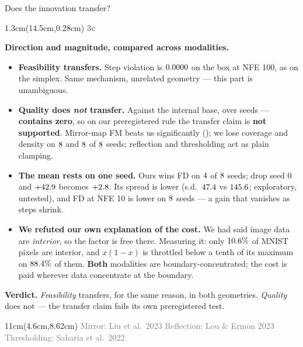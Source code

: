 \documentclass[aspectratio=169,10pt]{beamer}
\newcommand{\lab}[1]{%
  \begin{textblock*}{1.3cm}(14.5cm,0.28cm)
    \raggedleft\bfseries\small\textcolor{gray}{#1}
  \end{textblock*}}
\newcommand{\srcs}[1]{%
  \begin{textblock*}{11cm}(4.6cm,8.62cm)
    \raggedleft\fontsize{4.8}{5.6}\selectfont\textcolor{gray}{#1}
  \end{textblock*}}
\begin{document}
\begin{frame}{Does the innovation transfer?}
\lab{3c}
\textbf{Direction and magnitude, compared across modalities.}
\begin{itemize}
\item \textbf{Feasibility transfers.} Step violation is $0.0000$ on the box at NFE 100, as on
the simplex. Same mechanism, unrelated geometry --- this part is unambiguous.
\item \textbf{Quality does \emph{not} transfer.} Against the internal base, \MTwoClaim{}
over \MTwoSeeds{} seeds --- \textbf{contains zero}, so on our preregistered rule the transfer claim
is \textbf{not supported}. Mirror-map FM beats us significantly (\MTwoVsMirror); we lose
coverage and density on $8$ and $8$ of $8$ seeds; reflection and thresholding act as plain clamping.
\item \textbf{The mean rests on one seed.} Ours wins FD on $4$ of $8$ seeds; drop seed
$0$ and $+42.9$ becomes $+2.8$. Its spread is lower (s.d.\ $47.4$ vs
$145.6$; exploratory, untested), and FD at NFE 10 is lower on $8$ seeds --- a gain
that vanishes as steps shrink.
\item \textbf{We refuted our own explanation of the cost.} We had said image data are
\emph{interior}, so the factor is free there. Measuring it: only $10.6\%$ of MNIST pixels are interior, and $x(1-x)$ is
throttled below a tenth of its maximum on $88.4\%$ of them. \textbf{Both} modalities are
boundary-concentrated; the cost is paid wherever data concentrate at the boundary.
\end{itemize}

\textbf{Verdict.} \emph{Feasibility} transfers, for the same reason, in both geometries.
\emph{Quality} does not --- the transfer claim fails its own preregistered test.
\srcs{Mirror: Liu et al.\ 2023 \quad Reflection: Lou \& Ermon 2023 \quad Thresholding: Saharia et al.\ 2022}
\end{frame}
\end{document}

